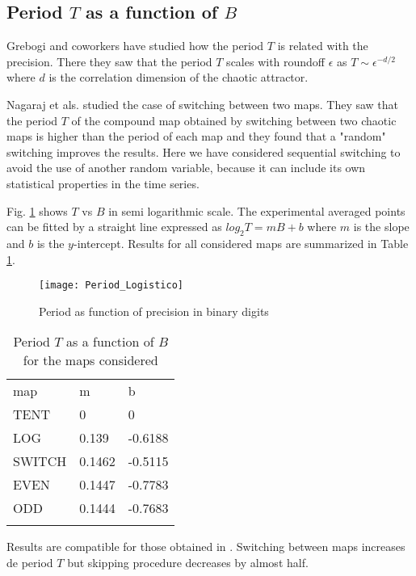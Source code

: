 \subsection{Period $T$ as a function of $B$}

Grebogi and coworkers \cite{Grebogi1988} have studied how the period $T$ is related with the precision.
There they saw that the period $T$ scales with roundoff $\epsilon$ as $T\sim\epsilon^{-d/2}$ where $d$ is the correlation dimension of the chaotic attractor.

Nagaraj et als. \cite{Nagaraj2008} studied the case of switching between two maps.
They saw that the period $T$ of the compound map obtained by switching between two chaotic maps is higher than the period of each map and they found that a "random" switching improves the results.
Here we have considered sequential switching to avoid the use of another random variable, because it can include its own statistical properties in the time series.

Fig. \ref{fig:period} shows  $T$ vs $B$ in semi logarithmic scale.
The experimental averaged points can be fitted by a straight line expressed as $log_{2}T=m B + b$ where $m$ is the slope and $b$ is the $y$-intercept.
Results for all considered maps are summarized in Table \ref{tabla:periodos}.

\begin{figure}
	\texttt{[image: Period\_Logistico]}
	\caption{Period as function of precision in binary digits} \label{fig:period}
\end{figure}

\begin{table}
	\caption{Period $T$ as a function of $B$ for the maps considered}
	\label{tabla:periodos}
	\begin{tabular}{lll}
		\hline\noalign{\smallskip}
		map & m & b  \\
		\noalign{\smallskip}\hline\noalign{\smallskip}
		TENT&0 & 0 \\
		LOG &0.139 & -0.6188 \\
		SWITCH &0.1462 & -0.5115 \\
		EVEN &0.1447 & -0.7783 \\
		ODD &0.1444 & -0.7683 \\
		\noalign{\smallskip}\hline
	\end{tabular}
\end{table}

Results are compatible for those obtained in \cite{Nagaraj2008}.
Switching between maps increases de period $T$ but skipping procedure decreases by almost half.